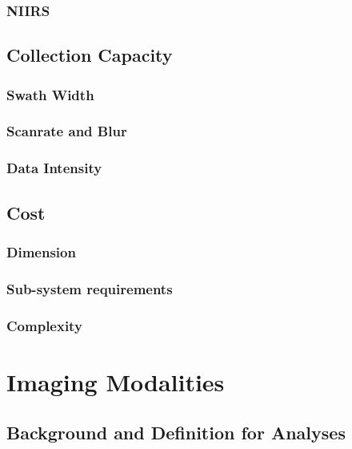\documentclass[10pt,journal]{IEEEtran}  %
\begin{document}
\subsubsection{NIIRS}

\subsection{Collection Capacity}
\label{sec:capacity}

\subsubsection{Swath Width}

\subsubsection{Scanrate and Blur}

\subsubsection{Data Intensity}

\subsection{Cost}
\label{sec:cost}

\subsubsection{Dimension}

\subsubsection{Sub-system requirements}

\subsubsection{Complexity}

\section{Imaging Modalities}
\label{sec:modalities}

\subsection{Background and Definition for Analyses}
\label{sec:analyses_background}
\end{document}
